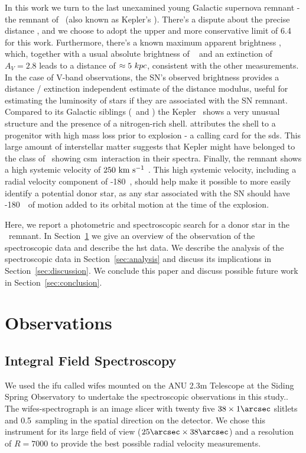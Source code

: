 \documentclass[preprint2]{aastex}
\begin{document}
In this work we turn to the last unexamined young Galactic supernova remnant - the remnant of \ (also known as Kepler's \sn). There's a dispute about the precise distance \citep[$4-6.4$\,\kpc; see][and references therein]{2012A&A...537A.139C}, and we choose to adopt the upper and more conservative limit of 6.4~\kpc\ \citep{1999AJ....118..926R} for this work. Furthermore, there's a known maximum apparent brightness \citep[V=-3;][]{1971SvA....14..798P}, which, together with a usual absolute brightness of \sneia\  \citep[$M_V=-19.3$;][]{2011ApJ...732..129R} and an extinction of $A_V=2.8$ leads to a distance of $\approx 5~kpc$, consistent with the other measurements. In the case of V-band observations, the SN's observed brightness provides a distance / extinction independent estimate of the distance modulus, useful for estimating the luminosity of stars if they are associated with the SN remnant. Compared to its Galactic siblings (\ and ) the Kepler \snr\ shows a very unusual structure and the presence of a nitrogen-rich shell.  \citet{2012A&A...537A.139C} attributes the shell to a progenitor with high mass loss prior to explosion - a calling card for the \gls{sds}. This large amount of interstellar matter suggests that Kepler might have belonged to the class of \sneia\ showing \gls{csm}\ interaction in their spectra. Finally, the remnant shows a high systemic velocity of  $250~\textrm{km}~\textrm{s}^{-1}$ \citep{1991ApJ...366..484B,2003A&A...407..249S}. This high systemic velocity, including a radial velocity component of -180~\kms, should help make it possible to more easily identify a potential donor star, as any star associated with the SN should have -180~\kms\ of motion added to its orbital motion at the time of the explosion.



Here, we report a photometric and spectroscopic search for a donor star in the \ remnant. In Section~\ref{sec:observations} we give an overview of the observation of the spectroscopic data and describe the \gls{hst} data. We describe the analysis of the spectroscopic data in Section~\ref{sec:analysis} and discuss its implications in Section~\ref{sec:discussion}. We conclude this paper and discuss possible future work in Section~\ref{sec:conclusion}.


\section{Observations}
\label{sec:observations}
\subsection{Integral Field Spectroscopy}
We used the \gls{ifu} called \gls{wifes} mounted on the ANU 2.3m Telescope at the Siding Spring Observatory  to undertake the spectroscopic observations in this study.. The \gls{wifes}-spectrograph is an image slicer with twenty five $38\times 1\arcsec$ slitlets and 0.5\arcsec\ sampling in the spatial direction on the detector. We chose this instrument for its large field of view ($25\arcsec\times38\arcsec$) and a resolution of $R=7000$ to provide the best possible radial velocity measurements. 
\end{document}
